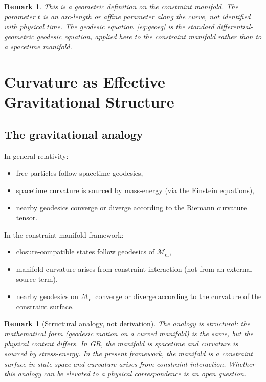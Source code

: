 \documentclass[12pt]{article}
\newtheorem{remark}[theorem]{Remark}
\newcommand{\Mcl}{\mathcal{M}_{\mathrm{cl}}}
\begin{document}
\begin{remark}
This is a geometric definition on the constraint manifold. The parameter $t$ is an arc-length or affine parameter along the curve, not identified with physical time. The geodesic equation~\eqref{eq:geoeq} is the standard differential-geometric geodesic equation, applied here to the constraint manifold rather than to a spacetime manifold.
\end{remark}

\section{Curvature as Effective Gravitational Structure}\label{sec:gravity}

\subsection{The gravitational analogy}

In general relativity:
\begin{itemize}
    \item free particles follow spacetime geodesics,
    \item spacetime curvature is sourced by mass-energy (via the Einstein equations),
    \item nearby geodesics converge or diverge according to the Riemann curvature tensor.
\end{itemize}

In the constraint-manifold framework:
\begin{itemize}
    \item closure-compatible states follow geodesics of $\Mcl$,
    \item manifold curvature arises from constraint interaction (not from an external source term),
    \item nearby geodesics on $\Mcl$ converge or diverge according to the curvature of the constraint surface.
\end{itemize}

\begin{remark}[Structural analogy, not derivation]
The analogy is structural: the mathematical form (geodesic motion on a curved manifold) is the same, but the physical content differs. In GR, the manifold is spacetime and curvature is sourced by stress-energy. In the present framework, the manifold is a constraint surface in state space and curvature arises from constraint interaction. Whether this analogy can be elevated to a physical correspondence is an open question.
\end{remark}
\end{document}
